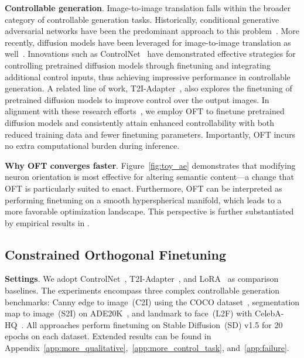 \begin{itemize}[leftmargin=*,nosep]
\textbf{Controllable generation}. Image-to-image translation falls within the broader category of controllable generation tasks. Historically, conditional generative adversarial networks have been the predominant approach to this problem~\cite{isola2017image,zhu2017toward,wang2018high,park2019semantic,choi2018stargan}. More recently, diffusion models have been leveraged for image-to-image translation as well~\cite{saharia2022palette,voynov2022sketch,wang2022pretraining}. Innovations such as ControlNet~\cite{zhang2023adding} have demonstrated effective strategies for controlling pretrained diffusion models through finetuning and integrating additional control inputs, thus achieving impressive performance in controllable generation. A related line of work, T2I-Adapter~\cite{mou2023t2i}, also explores the finetuning of pretrained diffusion models to improve control over the output images. In alignment with these research efforts~\cite{zhang2023adding,mou2023t2i}, we employ OFT to finetune pretrained diffusion models and consistently attain enhanced controllability with both reduced training data and fewer finetuning parameters. Importantly, OFT incurs no extra computational burden during inference.

\textbf{Why OFT converges faster}. Figure~\ref{fig:toy_ae} demonstrates that modifying neuron orientation is most effective for altering semantic content—a change that OFT is particularly suited to enact. Furthermore, OFT can be interpreted as performing finetuning on a smooth hyperspherical manifold, which leads to a more favorable optimization landscape. This perspective is further substantiated by empirical results in \cite{liu2021orthogonal}.

\subsection{Constrained Orthogonal Finetuning}

\textbf{Settings}. We adopt ControlNet~\cite{zhang2023adding}, T2I-Adapter~\cite{mou2023t2i}, and LoRA~\cite{hulora2022} as comparison baselines. The experiments encompass three complex controllable generation benchmarks: Canny edge to image~(C2I) using the COCO dataset~\cite{lin2014microsoft}, segmentation map to image~(S2I) on ADE20K~\cite{zhou2017scene}, and landmark to face~(L2F) with CelebA-HQ~\cite{karras2018progressive,xia2021tedigan}. All approaches perform finetuning on Stable Diffusion~(SD) v1.5 for 20 epochs on each dataset. Extended results can be found in Appendix~\ref{app:more_qualitative},~\ref{app:more_control_task}, and~\ref{app:failure}.


\end{itemize}
